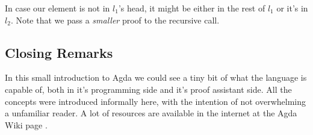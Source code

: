 
In case our element is not in $l_1$'s head, it might be either in the rest of $l_1$ or it's in $l_2$.
Note that we pass a \emph{smaller} proof to the recursive call.

\subsection{Closing Remarks}

In this small introduction to Agda we could see a tiny bit of what the language is capable of,
both in it's programming side and it's proof assistant side. All the concepts were introduced
informally here, with the intention of not overwhelming a unfamiliar reader. A lot of resources
are available in the internet at the Agda Wiki page \cite{AgdaTutorials}. 



